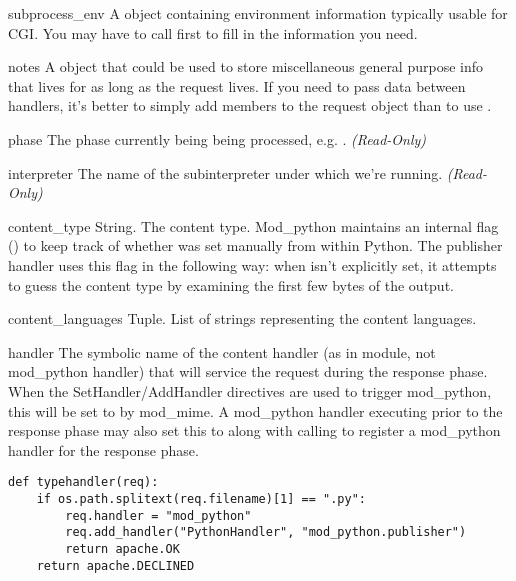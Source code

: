 \begin{memberdesc}[request]{subprocess_env}
  A  object containing environment information typically usable for CGI.
  You may have to call  first to fill in the information
  you need.
\end{memberdesc}

\begin{memberdesc}[request]{notes}
  A  object that could be used to store miscellaneous
  general purpose info that lives for as long as the request lives. If
  you need to pass data between handlers, it's better to simply add
  members to the request object than to use .
\end{memberdesc}

\begin{memberdesc}[request]{phase}
  The phase currently being being processed, e.g. .
  \emph{(Read-Only)}
\end{memberdesc}

\begin{memberdesc}[request]{interpreter}
  The name of the subinterpreter under which we're running.
  \emph{(Read-Only)}
\end{memberdesc}

\begin{memberdesc}[request]{content_type}
  String. The content type. Mod_python maintains an internal flag
  () to keep track of whether
   was set manually from within Python. The
  publisher handler uses this flag in the following way: when
   isn't explicitly set, it attempts to guess the
  content type by examining the first few bytes of the output.
\end{memberdesc}

\begin{memberdesc}[request]{content_languages}
  Tuple. List of strings representing the content languages. 
\end{memberdesc}

\begin{memberdesc}[request]{handler}
  The symbolic name of the content handler (as in module, not mod_python
  handler) that will service the request during the response phase. When
  the SetHandler/AddHandler directives are used to trigger mod_python, this
  will be set to  by mod_mime. A mod_python handler executing
  prior to the response phase may also set this to  along
  with calling  to register a mod_python handler
  for the response phase.

  \begin{verbatim}
def typehandler(req):
    if os.path.splitext(req.filename)[1] == ".py":
        req.handler = "mod_python"
        req.add_handler("PythonHandler", "mod_python.publisher")
        return apache.OK
    return apache.DECLINED
  \end{verbatim}                              

\end{memberdesc}

